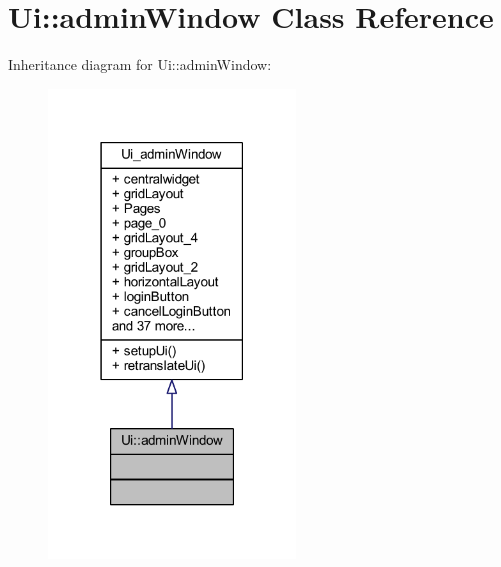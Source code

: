 \hypertarget{class_ui_1_1admin_window}{}\section{Ui\+:\+:admin\+Window Class Reference}
\label{class_ui_1_1admin_window}


Inheritance diagram for Ui\+:\+:admin\+Window\+:
\nopagebreak
\begin{figure}[H]
\begin{center}
\leavevmode
\includegraphics[width=186pt]{class_ui_1_1admin_window__inherit__graph}
\end{center}
\end{figure}


